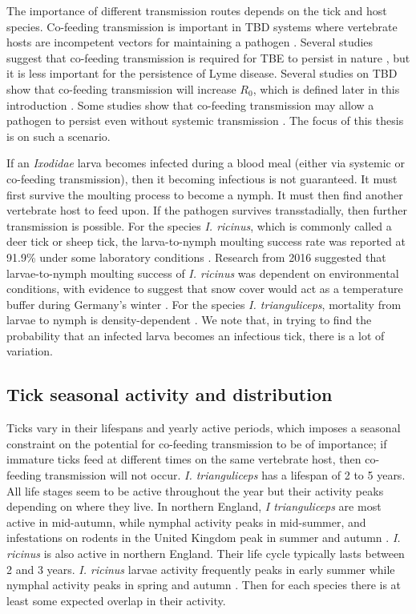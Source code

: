 \documentclass{article}
\begin{document}
The importance of different transmission routes depends on the tick and host species. Co-feeding transmission is important in TBD systems where vertebrate hosts are incompetent vectors for maintaining a pathogen \cite{HARRISON2012}. Several studies suggest that co-feeding transmission is required for TBE to persist in nature \cite{Hartemink2008, HARRISON2012}, but it is less important for the persistence of Lyme disease. Several studies on TBD show that co-feeding transmission will increase $ R_0 $, which is defined later in this introduction \cite{JohnstoneRobertson2020, Rosa2003, Norman2004}. Some studies show that co-feeding transmission may allow a pathogen to persist even without systemic transmission \cite{Rosa2003, Norman2004}. The focus of this thesis is on such a scenario.

If an \textit{Ixodidae} larva becomes infected during a blood meal (either via systemic or co-feeding transmission), then it becoming infectious is not guaranteed. It must first survive the moulting process to become a nymph. It must then find another vertebrate host to feed upon. If the pathogen survives transstadially, then further transmission is possible. For the species \textit{I. ricinus}, which is commonly called a deer tick or sheep tick, the larva-to-nymph moulting success rate was reported at 91.9\% under some laboratory conditions \cite{Hurry2021}. Research from 2016 suggested that larvae-to-nymph moulting success of \textit{I. ricinus} was dependent on environmental conditions, with evidence to suggest that snow cover would act as a temperature buffer during Germany's winter \cite{Dautel2016}. For the species \textit{I. trianguliceps}, mortality from larvae to nymph is density-dependent \cite{Randolph1994}. We note that, in trying to find the probability that an infected larva becomes an infectious tick, there is a lot of variation.

\subsection{Tick seasonal activity and distribution}

Ticks vary in their lifespans and yearly active periods, which imposes a seasonal constraint on the potential for co-feeding transmission to be of importance; if immature ticks feed at different times on the same vertebrate host, then co-feeding transmission will not occur. \textit{I. trianguliceps} has a lifespan of 2 to 5 years. All life stages seem to be active throughout the year but their activity peaks depending on where they live. In northern England, \textit{I trianguliceps} are most active in mid-autumn, while nymphal activity peaks in mid-summer, and infestations on rodents in the United Kingdom peak in summer and autumn \cite{Pf_ffle_2017}. \textit{I. ricinus} is also active in northern England. Their life cycle typically lasts between 2 and 3 years. \textit{I. ricinus} larvae activity frequently peaks in early summer while nymphal activity peaks in spring and autumn \cite{Otranto_2017}. Then for each species there is at least some expected overlap in their activity.
\end{document}
